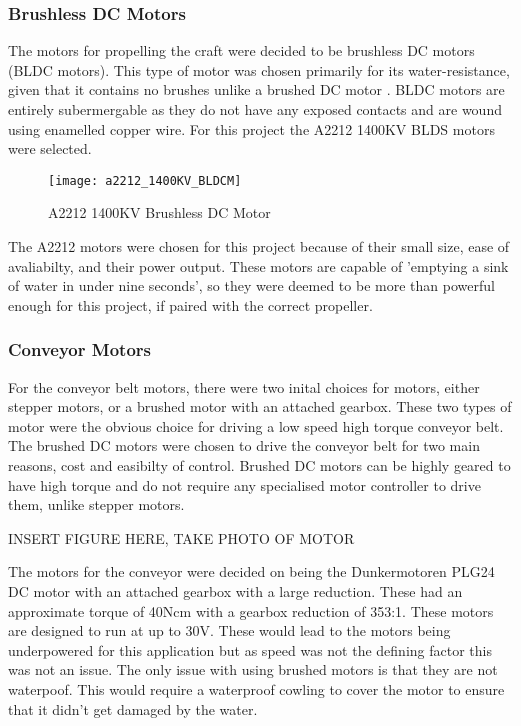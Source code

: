 \documentclass [11pt]{article}
\begin{document}
\subsubsection{Brushless DC Motors}

The motors for propelling the craft were decided to be brushless DC motors (BLDC motors). This type of motor was chosen primarily for its water-resistance, given that it contains no brushes unlike a brushed DC motor \cite{brushed_vs_brushless}. BLDC motors are entirely subermergable as they do not have any exposed contacts and are wound using enamelled copper wire. For this project the A2212 1400KV BLDS motors were selected. 

\begin{figure}[H]
\centerline{\texttt{[image: a2212\_1400KV\_BLDCM]}}
\caption{A2212 1400KV Brushless DC Motor}
\label{fig:a2212_1400KV_BLDCM}
\end{figure}

The A2212 motors were chosen for this project because of their small size, ease of avaliabilty, and their power output. These motors are capable of 'emptying a sink of water in under nine seconds', so they were deemed to be more than powerful enough for this project, if paired with the correct propeller. 

\subsubsection{Conveyor Motors}

For the conveyor belt motors, there were two inital choices for motors, either stepper motors, or a brushed motor with an attached gearbox. These two types of motor were the obvious choice for driving a low speed high torque conveyor belt. The brushed DC motors were chosen to drive the conveyor belt for two main reasons, cost and easibilty of control. Brushed DC motors can be highly geared to have high torque and do not require any specialised motor controller to drive them, unlike stepper motors.

INSERT FIGURE HERE, TAKE PHOTO OF MOTOR

The motors for the conveyor were decided on being  the Dunkermotoren PLG24 DC motor with an attached gearbox with a large reduction. These had an approximate torque of 40Ncm with a gearbox reduction of 353:1. These motors are designed to run at up to 30V. These would lead to the motors being underpowered for this application but as speed was not the defining factor this was not an issue. The only issue with using brushed motors is that they are not waterpoof. This would require a waterproof cowling to cover the motor to ensure that it didn't get damaged by the water. 
\end{document}
